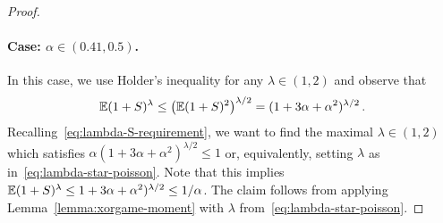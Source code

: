 \begin{proof}
    \paragraph{Case: $\alpha \in (0.41, 0.5)$.}
    In this case, we use Holder's inequality for any $\lambda \in (1,2)$ 
    and observe that 
    $$
        \operatorname{\mathbb{E}} (1+S)^\lambda 
        \leq \left( \operatorname{\mathbb{E}} (1+S)^2 \right)^{\lambda/2} 
        = (1 + 3\alpha +\alpha^2)^{\lambda/2}
        \,.
    $$
    Recalling~\eqref{eq:lambda-S-requirement}, 
    we want to find the maximal $\lambda \in (1, 2)$ 
    which satisfies $\alpha(1 + 3\alpha +\alpha^2)^{\lambda/2} \leq 1$ or, 
    equivalently, setting $\lambda$ as in~\eqref{eq:lambda-star-poisson}. 
    Note that this implies $\operatorname{\mathbb{E}} (1+S)^\lambda \leq 1 + 3\alpha +\alpha^2)^{\lambda/2} \leq 1/\alpha$.
    The claim follows from applying Lemma~\ref{lemma:xorgame-moment} 
    with $\lambda$ from~\eqref{eq:lambda-star-poisson}. 
  \end{proof}


